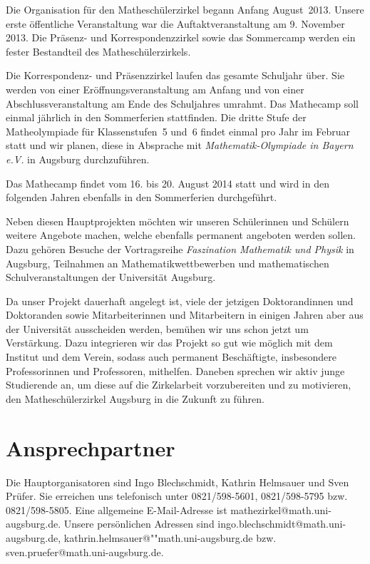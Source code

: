 \documentclass[12pt]{zettel}
\begin{document}
Die Organisation für den Matheschülerzirkel begann Anfang August~2013. Unsere
erste öffentliche Veranstaltung war die Auftaktveranstaltung am 9. November 2013.
Die Präsenz- und Korrespondenzzirkel sowie
das Sommercamp werden ein fester Bestandteil des Matheschülerzirkels.

Die Korrespondenz- und Präsenzzirkel laufen
das gesamte Schuljahr über. Sie werden von einer
Eröffnungsveranstaltung am Anfang und von einer
Abschlussveranstaltung am Ende des Schuljahres umrahmt. Das Mathecamp soll
einmal jährlich in den Sommerferien stattfinden. Die dritte Stufe der
Matheolympiade für Klassenstufen~5 und~6 findet einmal pro Jahr
im Februar statt und wir planen, diese in
Absprache mit \emph{Mathematik-Olympiade in Bayern e.V.} in Augsburg
durchzuführen.

Das Mathecamp findet vom 16. bis 20. August 2014 statt und wird in den folgenden Jahren ebenfalls in den Sommerferien durchgeführt.

Neben diesen Hauptprojekten möchten wir unseren Schülerinnen und
Schülern weitere Angebote machen, welche ebenfalls permanent angeboten
werden sollen. Dazu gehören Besuche der Vortragsreihe \emph{Faszination
Mathematik und Physik} in Augsburg, Teilnahmen
an Mathematikwettbewerben und mathematischen Schulveranstaltungen der Universität Augsburg.

Da unser Projekt dauerhaft angelegt ist, viele der jetzigen Doktorandinnen und Doktoranden sowie Mitarbeiterinnen und Mitarbeitern in einigen Jahren aber aus der Universität ausscheiden werden,
bemühen wir uns schon jetzt um Verstärkung.
Dazu integrieren wir das Projekt so gut wie möglich mit
dem Institut und dem Verein, sodass auch permanent Beschäftigte,
insbesondere Professorinnen und Professoren, mithelfen. Daneben sprechen wir
aktiv junge Studierende an, um diese auf die Zirkelarbeit
vorzubereiten und zu motivieren, den Matheschülerzirkel
Augsburg in die Zukunft zu führen.


\section{Ansprechpartner}

Die Hauptorganisatoren sind Ingo Blechschmidt, Kathrin Helmsauer und Sven
Prüfer. Sie erreichen uns telefonisch unter 0821/598-5601, 0821/598-5795 bzw.
0821/598-5805. Eine allgemeine E-Mail-Adresse ist
\textsf{mathezirkel@math.uni-augsburg.de}. Unsere persönlichen Adressen sind
\textsf{ingo.blechschmidt@math.uni-augsburg.de},
\textsf{kathrin.helmsauer@""math.uni-augsburg.de} bzw.
\textsf{sven.pruefer@math.uni-augsburg.de}.
\end{document}
